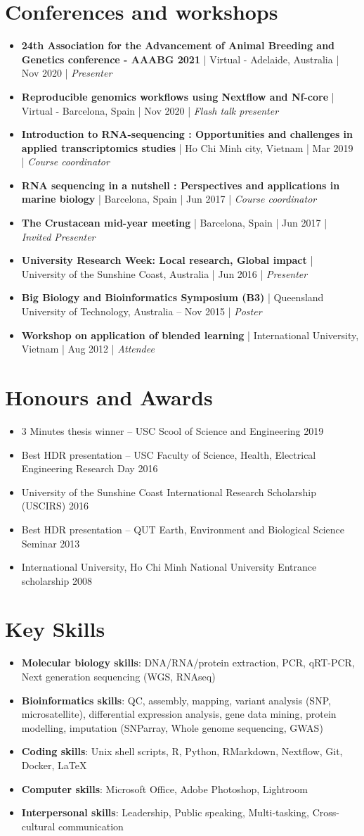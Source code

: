 \documentclass[letterpaper,11pt]{article}
\newcommand{\resumeItem}[2]{
  \item\small{
    \textbf{#1}{: #2 \vspace{0pt}}
  }
}
\newcommand{\resumeBlack}[1]{\item\small{{#1}}}
\newcommand{\resumeSubItem}[2]{\resumeItem{#1}{#2}}
\newcommand{\resumeItemListStart}{\begin{itemize}}
\newcommand{\resumeItemListEnd}{\end{itemize}}
\begin{document}
\section{Conferences and workshops}
  \resumeItemListStart
    \resumeBlack{\textbf{24th Association for the Advancement of Animal Breeding and Genetics conference - AAABG 2021}  | Virtual - Adelaide, Australia | Nov 2020 | \textit{Presenter}}
    \resumeBlack{\textbf{Reproducible genomics workflows using Nextflow and Nf-core}  | Virtual - Barcelona, Spain | Nov 2020 | \textit{Flash talk presenter}}
    \resumeBlack{\textbf{Introduction to RNA-sequencing : Opportunities and challenges in applied transcriptomics studies}  |  Ho Chi Minh city, Vietnam | Mar 2019 | \textit{Course coordinator}}
    \resumeBlack{\textbf{RNA sequencing in a nutshell : Perspectives and applications in marine biology}  |  Barcelona, Spain | Jun 2017 | \textit{Course coordinator}}
    \resumeBlack{\textbf{The Crustacean mid-year meeting} | Barcelona, Spain | Jun 2017 | \textit{Invited Presenter}}
    \resumeBlack{\textbf{University Research Week: Local research, Global impact} | University of the Sunshine Coast, Australia | Jun 2016 | \textit{Presenter}}
    \resumeBlack{\textbf{Big Biology and Bioinformatics Symposium (B3)} | Queensland University of Technology, Australia – Nov 2015 | \textit{Poster}}
    \resumeBlack{\textbf{Workshop on application of blended learning} | International University, Vietnam | Aug 2012 | \textit{Attendee}}
  \resumeItemListEnd

\section{Honours and Awards}
\resumeItemListStart
	\resumeBlack{3 Minutes thesis winner – USC Scool of Science and Engineering 2019}
	\resumeBlack{Best HDR presentation – USC Faculty of Science, Health, Electrical Engineering Research Day 2016}
  \resumeBlack{University of the Sunshine Coast International Research Scholarship (USCIRS) 2016}
  \resumeBlack{Best HDR presentation –  QUT Earth, Environment and Biological Science Seminar 2013}
  \resumeBlack{International University, Ho Chi Minh National University Entrance scholarship 2008}
\resumeItemListEnd  

\section{Key Skills}
 \resumeItemListStart
    \resumeSubItem{Molecular biology skills}{DNA/RNA/protein extraction, PCR, qRT-PCR, Next generation sequencing (WGS, RNAseq)}
    \resumeSubItem{Bioinformatics skills}{QC, assembly, mapping, variant analysis (SNP, microsatellite), differential expression analysis, gene data mining, protein modelling, imputation (SNParray, Whole genome sequencing, GWAS)}
    \resumeSubItem{Coding skills}{Unix shell scripts, R, Python, RMarkdown, Nextflow, Git, Docker, LaTeX}
    \resumeSubItem{Computer skills}{Microsoft Office, Adobe Photoshop, Lightroom}
    \resumeSubItem{Interpersonal skills}{Leadership, Public speaking, Multi-tasking, Cross-cultural communication}
  \resumeItemListEnd
\end{document}
